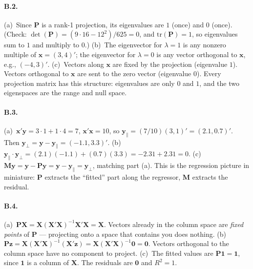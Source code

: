 \documentclass{article}
\begin{document}
\paragraph{B.2.}  (a)~Since $\bm{P}$ is a rank-1 projection, its eigenvalues are $1$ (once) and $0$ (once).  (Check: $\det(\bm{P}) = (9\cdot 16 - 12^2)/625 = 0$, and $\text{tr}(\bm{P}) = 1$, so eigenvalues sum to $1$ and multiply to $0$.)  (b)~The eigenvector for $\lambda = 1$ is any nonzero multiple of $\bm{x} = (3,4)'$; the eigenvector for $\lambda = 0$ is any vector orthogonal to $\bm{x}$, e.g., $(-4, 3)'$.  (c)~Vectors along $\bm{x}$ are fixed by the projection (eigenvalue $1$).  Vectors orthogonal to $\bm{x}$ are sent to the zero vector (eigenvalue $0$).  Every projection matrix has this structure: eigenvalues are only $0$ and $1$, and the two eigenspaces are the range and null space.

\paragraph{B.3.}  (a)~$\bm{x}'\bm{y} = 3\cdot 1 + 1\cdot 4 = 7$, $\bm{x}'\bm{x} = 10$, so $\bm{y}_\| = (7/10)(3,1)' = (2.1, 0.7)'$.  Then $\bm{y}_\perp = \bm{y} - \bm{y}_\| = (-1.1, 3.3)'$.  (b)~$\bm{y}_\| \cdot \bm{y}_\perp = (2.1)(-1.1) + (0.7)(3.3) = -2.31 + 2.31 = 0$. \checkmark  (c)~$\bm{M}\bm{y} = \bm{y} - \bm{P}\bm{y} = \bm{y} - \bm{y}_\| = \bm{y}_\perp$, matching part (a).  This is the regression picture in miniature: $\bm{P}$ extracts the ``fitted'' part along the regressor, $\bm{M}$ extracts the residual.

\paragraph{B.4.}  (a)~$\bm{P}\bm{X} = \bm{X}(\bm{X}'\bm{X})^{-1}\bm{X}'\bm{X} = \bm{X}$.  Vectors already in the column space are \emph{fixed points} of $\bm{P}$ --- projecting onto a space that contains you does nothing.  (b)~$\bm{P}\bm{z} = \bm{X}(\bm{X}'\bm{X})^{-1}(\bm{X}'\bm{z}) = \bm{X}(\bm{X}'\bm{X})^{-1}\bm{0} = \bm{0}$.  Vectors orthogonal to the column space have no component to project.  (c)~The fitted values are $\bm{P}\bm{1} = \bm{1}$, since $\bm{1}$ is a column of $\bm{X}$.  The residuals are $\bm{0}$ and $R^2 = 1$.
\end{document}
